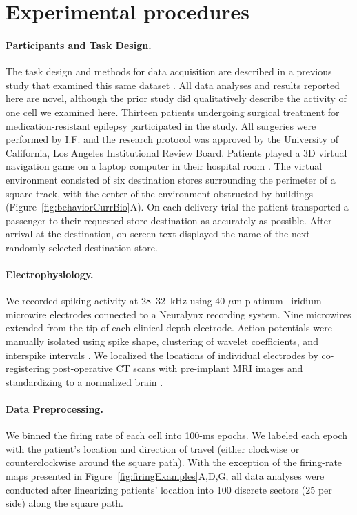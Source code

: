 \section{Experimental procedures}

\paragraph{Participants and Task Design.} The task design and methods for data acquisition are described in a previous study that examined this same dataset \citep{JacoEtal10}. All data analyses and results reported here are novel, although the prior study \citep{JacoEtal10} did qualitatively describe the activity of one cell we examined here. Thirteen patients undergoing surgical treatment for medication-resistant epilepsy participated in the study.  All surgeries were performed by I.F. and the research protocol was approved by the University of California, Los Angeles Institutional Review Board.  Patients played a 3D virtual navigation game on a laptop computer in their hospital room \citep{EkstEtal03,JacoEtal10,JacoKaha10,JacoEtal13}. The virtual environment consisted of six destination stores surrounding the perimeter of a square track, with the center of the environment obstructed by buildings (Figure~\ref{fig:behaviorCurrBio}A). On each delivery trial the patient transported a passenger to their requested store destination as accurately as possible.  After arrival at the destination, on-screen text displayed the name of the next randomly selected destination store.

\paragraph{Electrophysiology.}  We recorded spiking activity at 28--32~kHz using 40-$\mu$m platinum-–iridium microwire electrodes \citep{FrieEtal99} connected to a Neuralynx recording system. Nine microwires extended from the tip of each clinical depth electrode. Action potentials were manually isolated using spike shape, clustering of wavelet coefficients, and interspike intervals \citep{QuirEtal04}.  We localized the locations of individual electrodes by co-registering post-operative CT scans with pre-implant MRI images and standardizing to a normalized brain \cite{TalaTour88}.

\paragraph{Data Preprocessing.} We binned the firing rate of each cell into 100-ms epochs. We labeled each epoch with the patient's location and direction of travel (either clockwise or counterclockwise around the square path). With the exception of the firing-rate maps presented in Figure~\ref{fig:firingExamples}A,D,G, all data analyses were conducted after linearizing patients' location into 100 discrete sectors (25 per side) along the square path.

